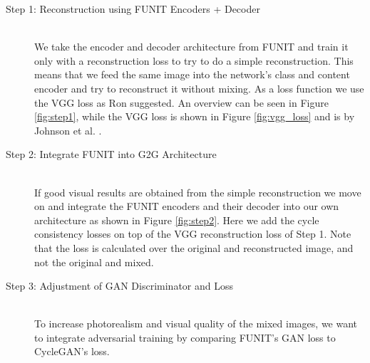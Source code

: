 \documentclass{article}
\begin{document}
\begin{description}
   \item[Step 1: Reconstruction using FUNIT Encoders + Decoder] \hfill \\
    We take the encoder and decoder architecture from FUNIT \cite{liu2019few} and train it only with a reconstruction loss to try to do a simple reconstruction. This means that we feed the same image into the network's class and content encoder and try to reconstruct it without mixing. As a loss function we use the VGG loss as Ron suggested. An overview can be seen in Figure \ref{fig:step1}, while the VGG loss is shown in Figure \ref{fig:vgg_loss} and is by Johnson et al. \cite{johnson2016perceptual}.
    \item[Step 2: Integrate FUNIT into G2G Architecture] \hfill \\
    If good visual results are obtained from the simple reconstruction we move on and integrate the FUNIT encoders and their decoder into our own architecture as shown in Figure \ref{fig:step2}. Here we add the cycle consistency losses on top of the VGG reconstruction loss of Step 1. Note that the loss is calculated over the original and reconstructed image, and not the original and mixed.
    \item[Step 3: Adjustment of GAN Discriminator and Loss] \hfill \\
    To increase photorealism and visual quality of the mixed images, we want to integrate adversarial training by comparing FUNIT's GAN loss to CycleGAN's loss.
\end{description}
\end{document}
